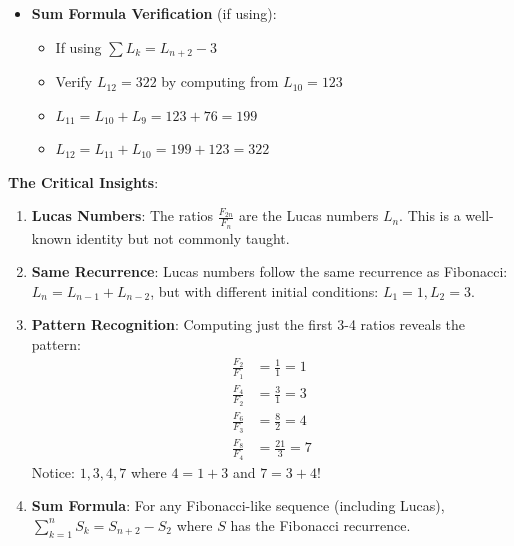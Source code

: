 \documentclass[12pt]{article}
\begin{document}
\begin{verificationbox}
\begin{itemize}[leftmargin=*]
    \item \textbf{Sum Formula Verification} (if using):
    \begin{itemize}
        \item If using $\sum L_k = L_{n+2} - 3$
        \item Verify $L_{12} = 322$ by computing from $L_{10} = 123$
        \item $L_{11} = L_{10} + L_9 = 123 + 76 = 199$
        \item $L_{12} = L_{11} + L_{10} = 199 + 123 = 322$ \checkmark
    \end{itemize}
\end{itemize}
\end{verificationbox}

\begin{keyinsightbox}
\textbf{The Critical Insights}:

\begin{enumerate}
    \item \textbf{Lucas Numbers}: The ratios $\frac{F_{2n}}{F_n}$ are the Lucas numbers $L_n$. This is a well-known identity but not commonly taught.
    
    \item \textbf{Same Recurrence}: Lucas numbers follow the same recurrence as Fibonacci: $L_n = L_{n-1} + L_{n-2}$, but with different initial conditions: $L_1 = 1, L_2 = 3$.
    
    \item \textbf{Pattern Recognition}: Computing just the first 3-4 ratios reveals the pattern:
    \begin{align*}
        \frac{F_2}{F_1} &= \frac{1}{1} = 1 \\
        \frac{F_4}{F_2} &= \frac{3}{1} = 3 \\
        \frac{F_6}{F_3} &= \frac{8}{2} = 4 \\
        \frac{F_8}{F_4} &= \frac{21}{3} = 7
    \end{align*}
    Notice: $1, 3, 4, 7$ where $4 = 1 + 3$ and $7 = 3 + 4$!
    
    \item \textbf{Sum Formula}: For any Fibonacci-like sequence (including Lucas), $\sum_{k=1}^{n} S_k = S_{n+2} - S_2$ where $S$ has the Fibonacci recurrence.
\end{enumerate}
\end{keyinsightbox}
\end{document}

